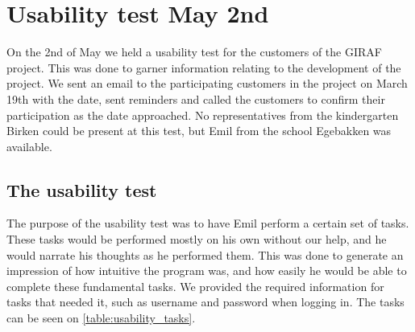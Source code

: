 \section{Usability test May 2nd}
On the 2nd of May we held a usability test for the customers of the GIRAF project.
This was done to garner information relating to the development of the project.
We sent an email to the participating customers in the project on March 19th with the date, sent reminders and called the customers to confirm their participation as the date approached.
No representatives from the kindergarten Birken could be present at this test, but Emil from the school Egebakken was available.

\subsection{The usability test}
The purpose of the usability test was to have Emil perform a certain set of tasks.
These tasks would be performed mostly on his own without our help, and he would narrate his thoughts as he performed them.
This was done to generate an impression of how intuitive the program was, and how easily he would be able to complete these fundamental tasks.
We provided the required information for tasks that needed it, such as username and password when logging in. 
The tasks can be seen on \autoref{table:usability_tasks}.
